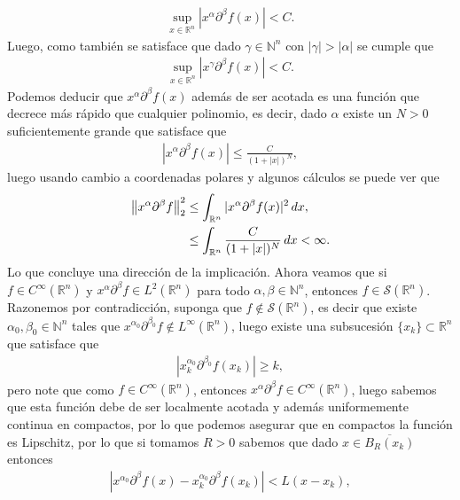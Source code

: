\begin{homeworkProblem}
\begin{solution}
    \begin{align*}
      \sup_{x\in\mathbb{R}^{n}}|x^{\alpha}\partial^{\beta}f(x)|< C. 
    \end{align*}
    Luego, como también se satisface que dado $\gamma\in\mathbb{N}^{n}$ con $|\gamma|>|\alpha|$ se cumple que 
    \begin{align*}
      \sup_{x\in\mathbb{R}^{n}}|x^{\gamma}\partial^{\beta}f(x)|<C.
    \end{align*}
    Podemos deducir que $x^{\alpha}\partial^{\beta}f(x)$ además de ser acotada es una función que decrece más rápido que cualquier polinomio, es decir, dado $\alpha$ existe un $N>0$ suficientemente grande que satisface que
    \begin{align*}
      |x^{\alpha}\partial^{\beta}f(x)|\leq \frac{C}{(1+|x|)^{N}},
    \end{align*}
luego usando cambio a coordenadas polares y algunos cálculos se puede ver que
    \begin{align*}
      \left\|x^{\alpha}\partial^{\beta}f\right\|_{2}^{2}&\leq \int_{\mathbb{R}^{n}}|x^{\alpha}\partial^{\beta}f(x)|^2\, dx,\\
      &\leq \int_{\mathbb{R}^{n}}\frac{C}{(1+|x|)^{N}}\, dx<\infty.
    \end{align*}
    Lo que concluye una dirección de la implicación.
    Ahora veamos que si $f\in C^{\infty}(\mathbb{R}^{n})$ y $x^{\alpha}\partial^{\beta}f\in L^{2}(\mathbb{R}^{n})$ para todo $\alpha,\beta\in\mathbb{N}^{n}$, entonces $f\in\mathcal{S}(\mathbb{R}^{n})$.\\
    Razonemos por contradicción, suponga que $f\notin\mathcal{S}(\mathbb{R}^{n})$, es decir que existe $\alpha_{0},\beta_{0}\in\mathbb{N}^{n}$ tales que $x^{\alpha_{0}}\partial^{\beta_{0}}f\notin L^{\infty}(\mathbb{R}^{n})$, luego existe una subsucesión $\{x_{k}\}\subset\mathbb{R}^{n}$ que satisface que
    \begin{align*}
      |x_{k}^{\alpha_{0}}\partial^{\beta_{0}}f(x_{k})|\geq k,
    \end{align*}
    pero note que como $f\in C^{\infty}(\mathbb{R}^{n})$, entonces $x^{\alpha}\partial^{\beta}f\in C^{\infty}(\mathbb{R}^{n})$, luego sabemos que esta función debe de ser localmente acotada y además uniformemente continua en compactos, por lo que podemos asegurar que en compactos la función es Lipschitz, por lo que si tomamos $R>0$ sabemos que dado $x\in \overline{B_{R}(x_{k})}$ entonces
    \begin{align*}
      |x^{\alpha_0}\partial^{\beta}f(x)-x_{k}^{\alpha_{0}}\partial^{\beta}f(x_{k})|<L(x-x_{k}),

\end{align*}
\end{solution}
\end{homeworkProblem}
